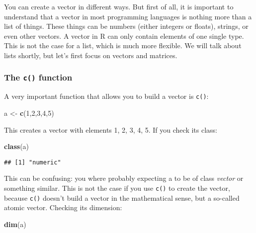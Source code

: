 \documentclass[
]{article}
\newenvironment{Shaded}{\begin{snugshade}}{\end{snugshade}}
\newcommand{\DecValTok}[1]{\textcolor[rgb]{0.00,0.00,0.81}{#1}}
\newcommand{\KeywordTok}[1]{\textcolor[rgb]{0.13,0.29,0.53}{\textbf{#1}}}
\newcommand{\NormalTok}[1]{#1}
\newcommand{\StringTok}[1]{\textcolor[rgb]{0.31,0.60,0.02}{#1}}
\begin{document}
You can create a vector in different ways. But first of all, it is important to understand that a
vector in most programming languages is nothing more than a list of things. These things can be
numbers (either integers or floats), strings, or even other vectors. A vector in R can only contain elements of one
single type. This is not the case for a list, which is much more flexible. We will talk about lists shortly, but
let's first focus on vectors and matrices.

\hypertarget{the-c-function}{%
\subsubsection{\texorpdfstring{The \texttt{c()} function}{The c() function}}\label{the-c-function}}

A very important function that allows you to build a vector is \texttt{c()}:

\begin{Shaded}
\begin{Highlighting}[]
\NormalTok{a \textless{}{-}}\StringTok{ }\KeywordTok{c}\NormalTok{(}\DecValTok{1}\NormalTok{,}\DecValTok{2}\NormalTok{,}\DecValTok{3}\NormalTok{,}\DecValTok{4}\NormalTok{,}\DecValTok{5}\NormalTok{)}
\end{Highlighting}
\end{Shaded}

This creates a vector with elements 1, 2, 3, 4, 5. If you check its class:

\begin{Shaded}
\begin{Highlighting}[]
\KeywordTok{class}\NormalTok{(a)}
\end{Highlighting}
\end{Shaded}

\begin{verbatim}
## [1] "numeric"
\end{verbatim}

This can be confusing: you where probably expecting a to be of class \emph{vector} or
something similar. This is not the case if you use \texttt{c()} to create the vector, because \texttt{c()}
doesn't build a vector in the mathematical sense, but a so-called atomic vector.
Checking its dimension:

\begin{Shaded}
\begin{Highlighting}[]
\KeywordTok{dim}\NormalTok{(a)}
\end{Highlighting}
\end{Shaded}
\end{document}
